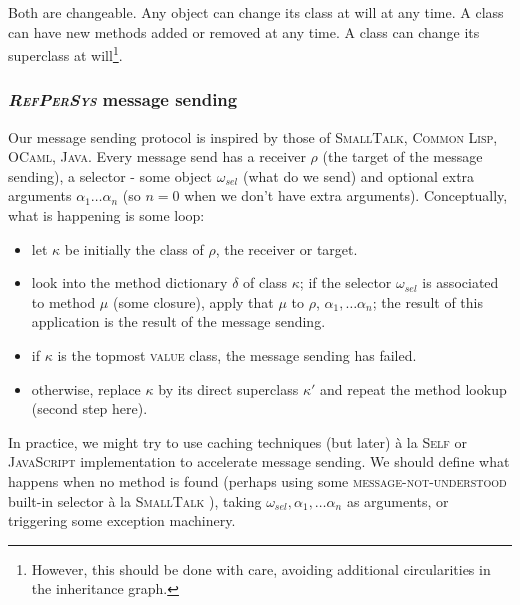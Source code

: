 \documentclass[11pt,a4paper,svgnames]{article}
\newcommand{\RefPerSys}{{\textit{\textsc{RefPerSys}}}}
\begin{document}
Both are changeable. Any object can change its class at will at any
time. A class can have new methods added or removed at any time. A
class can change its superclass at will\footnote{However, this should
be done with care, avoiding additional circularities in the
inheritance graph.}.

\medskip

\subsubsection{{\RefPerSys} message sending}
\label{subsubsec:message-sending}

Our message sending protocol is inspired by those of
\textsc{SmallTalk}, \textsc{Common Lisp}, \textsc{OCaml},
\textsc{Java}. Every message send has a receiver $\rho$ (the target of
the message sending), a selector - some object $\omega_{sel}$ (what do
we send) and optional extra arguments $\alpha_1 \ldots \alpha_n$ (so
$n = 0$ when we don't have extra arguments). Conceptually, what is
happening is some loop:

\begin{itemize}
\item let $\kappa$ be initially the class of $\rho$, the receiver or target.
\item look into the method dictionary $\delta$ of class $\kappa$; if
  the selector $\omega_{sel}$ is associated to method $\mu$ (some
  closure), apply that $\mu$ to $\rho$, $\alpha_1, \ldots \alpha_n$;
  the result of this application is the result of the message sending.
\item if $\kappa$ is the topmost \textsc{value} class, the message
    sending has failed.
  \item otherwise, replace $\kappa$ by its direct superclass $\kappa'$
    and repeat the method lookup (second step here).
\end{itemize}

In practice, we might try to use caching techniques (but later) à la
\textsc{Self} or \textsc{JavaScript} implementation to accelerate
message sending. We should define what happens when no method is found
(perhaps using some \textsc{message-not-understood} built-in selector à
la \textsc{SmallTalk} \cite{kay:1996:early-smalltalk}), taking
$\omega_{sel}, \alpha_1, \ldots \alpha_n$ as arguments, or triggering
some exception machinery.

\bigskip



\end{document}
